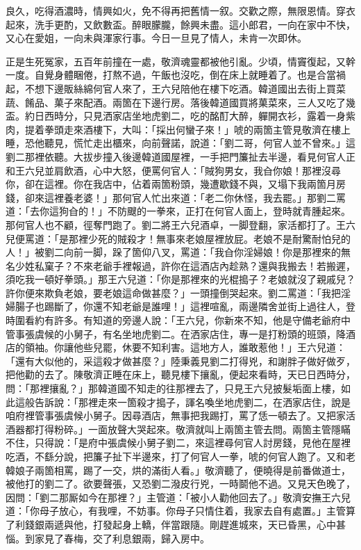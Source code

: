良久，吃得酒濃時，情興如火，免不得再把舊情一叙。交歡之際，無限恩情。穿衣起來，洗手更酌，又飲數盃。醉眼朦朧，餘興未盡。這小郎君，一向在家中不快，又心在愛姐，一向未與渾家行事。今日一旦見了情人，未肯一次即休。

正是生死冤家，五百年前撞在一處，敬濟魂靈都被他引亂。少頃，情竇復起，又幹一度。自覺身體睏倦，打熬不過，午飯也沒吃，倒在床上就睡着了。也是合當禍起，不想下邊販絲綿何官人來了，王六兒陪他在樓下吃酒。韓道國出去街上買菜蔬、餚品、菓子來配酒。兩箇在下邊行房。落後韓道國買將菓菜來，三人又吃了幾盃。約日西時分，只見洒家店坐地虎劉二，吃的酩酊大醉，軃開衣衫，露着一身紫肉，提着拳頭走來酒樓下，大叫：「採出何蠻子來！」唬的兩箇主管見敬濟在樓上睡，恐他聽見，慌忙走出櫃來，向前聲諾，說道：「劉二哥，何官人並不曾來。」這劉二那裡依聽。大拔步撞入後邊韓道國屋裡，一手把門簾扯去半邊，看見何官人正和王六兒並肩飲酒，心中大怒，便罵何官人：「賊狗男女，我㒲你娘！那裡沒尋你，卻在這裡。你在我店中，佔着兩箇粉頭，幾遭歇錢不與，又塌下我兩箇月房錢，卻來這裡養老婆！」{}那何官人忙出來道：「老二你休怪，我去罷。」那劉二罵道：「去你這狗㒲的！」不防颼的一拳來，正打在何官人面上，登時就青腫起來。那何官人也不顧，徑奪門跑了。劉二將王六兒酒卓，一脚登翻，家活都打了。王六兒便罵道：「是那裡少死的賊殺才！無事來老娘屋裡放屁。老娘不是耐驚耐怕兒的人！」{}被劉二向前一脚，跺了箇仰八叉，罵道：「我㒲你淫婦娘！你是那裡來的無名少姓私窠子？不來老爺手裡報過，許你在這酒店內趁熟？還與我搬去！若搬遲，須吃我一頓好拳頭。」那王六兒道：「你是那裡來的光棍搗子？老娘就沒了親戚兒？許你便來欺負老娘，要老娘這命做甚麼？」一頭撞倒哭起來。劉二罵道：「我把淫婦腸子也踢斷了，你還不知老爺是誰哩！」這裡喧亂，兩邊隣舍並街上過往人，登時圍看約有許多。有知道的旁邊人說：「王六兒，你新來不知，他是守備老爺府中管事張虞候的小舅子，有名坐地虎劉二。在洒家店住，專一是打粉頭的班頭，降酒店的領袖。你讓他些兒罷，休要不知利害。這地方人，誰敢惹他！」王六兒道：「還有大似他的，采這殺才做甚麼？」陸秉義見劉二打得兇，和謝胖子做好做歹，把他勸的去了。陳敬濟正睡在床上，聽見樓下攘亂，便起來看時，天已日西時分，問：「那裡攘亂？」那韓道國不知走的往那裡去了，只見王六兒披髮垢面上樓，如此這般告訴說：「那裡走來一箇殺才搗子，諢名喚坐地虎劉二，在洒家店住，說是咱府裡管事張虞候小舅子。因尋酒店，無事把我踢打，罵了恁一頓去了。又把家活酒器都打得粉碎。」一面放聲大哭起來。敬濟就叫上兩箇主管去問。兩箇主管隱瞞不住，只得說：「是府中張虞候小舅子劉二，來這裡尋何官人討房錢，見他在屋裡吃酒，不繇分說，把簾子扯下半邊來，打了何官人一拳，唬的何官人跑了。又和老韓娘子兩箇相罵，踢了一交，烘的滿街人看。」敬濟聽了，便曉得是前番做道士，被他打的劉二了。欲要聲張，又恐劉二潑皮行兇，一時鬬他不過。又見天色晚了，因問：「劉二那厮如今在那裡？」主管道：「被小人勸他回去了。」敬濟安撫王六兒道：「你母子放心，有我哩，不妨事。你母子只情住着，我家去自有處置。」主管算了利錢銀兩遞與他，打發起身上轎，伴當跟隨。剛趕進城來，天已昏黑，心中甚惱。到家見了春梅，交了利息銀兩，歸入房中。

